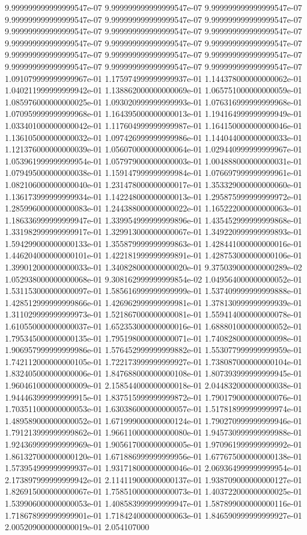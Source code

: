 9.999999999999999547e-07	9.999999999999999547e-07	9.999999999999999547e-07	9.999999999999999547e-07	9.999999999999999547e-07	9.999999999999999547e-07	9.999999999999999547e-07	9.999999999999999547e-07	9.999999999999999547e-07	9.999999999999999547e-07	9.999999999999999547e-07	9.999999999999999547e-07	9.999999999999999547e-07	9.999999999999999547e-07	9.999999999999999547e-07	9.999999999999999547e-07	9.999999999999999547e-07	9.999999999999999547e-07	1.091079999999999967e-01	1.175974999999999937e-01	1.144378000000000062e-01	1.040211999999999942e-01	1.138862000000000069e-01	1.065751000000000059e-01	1.085976000000000025e-01	1.093020999999999993e-01	1.076316999999999968e-01	1.070959999999999968e-01	1.164395000000000013e-01	1.194164999999999949e-01	1.033401000000000042e-01	1.117604999999999987e-01	1.164150000000000046e-01	1.136105000000000032e-01	1.097426999999999986e-01	1.144044000000000033e-01	1.121376000000000039e-01	1.056070000000000064e-01	1.029440999999999967e-01	1.053961999999999954e-01	1.057979000000000003e-01	1.004888000000000031e-01	1.079495000000000038e-01	1.159147999999999984e-01	1.076697999999999961e-01	1.082106000000000040e-01	1.231478000000000017e-01	1.353329000000000060e-01	1.136173999999999934e-01	1.142248000000000013e-01	1.295875999999999972e-01	1.285996000000000083e-01	1.244388000000000022e-01	1.165222000000000063e-01	1.186336999999999947e-01	1.339954999999999896e-01	1.435452999999999868e-01	1.331982999999999917e-01	1.329913000000000067e-01	1.349220999999999893e-01	1.594299000000000133e-01	1.355879999999999863e-01	1.428441000000000016e-01	1.446204000000000101e-01	1.422181999999999891e-01	1.428753000000000106e-01	1.399012000000000033e-01	1.340828000000000020e-01	9.375039000000000289e-02	1.052938000000000068e-01	9.308162999999999854e-02	1.049564000000000052e-01	1.531153000000000097e-01	1.585616999999999999e-01	1.537409999999999888e-01	1.428512999999999866e-01	1.426962999999999981e-01	1.378130999999999939e-01	1.311029999999999973e-01	1.521867000000000081e-01	1.559414000000000078e-01	1.610550000000000037e-01	1.652353000000000016e-01	1.688801000000000052e-01	1.795345000000000135e-01	1.795198000000000071e-01	1.740828000000000098e-01	1.906957999999999986e-01	1.576452999999999882e-01	1.553077999999999959e-01	1.742112000000000105e-01	1.722173999999999927e-01	1.738087000000000104e-01	1.832405000000000006e-01	1.847688000000000108e-01	1.807393999999999945e-01	1.960461000000000009e-01	2.158544000000000018e-01	2.044832000000000038e-01	1.944463999999999915e-01	1.837515999999999872e-01	1.790179000000000076e-01	1.703511000000000053e-01	1.630386000000000057e-01	1.517818999999999974e-01	1.489589000000000052e-01	1.671999000000000124e-01	1.790270999999999946e-01	1.791213999999999862e-01	1.966110000000000080e-01	1.945730999999999988e-01	1.924369999999999969e-01	1.905617000000000005e-01	1.970961999999999992e-01	1.861327000000000120e-01	1.671886999999999956e-01	1.677675000000000138e-01	1.573954999999999937e-01	1.931718000000000046e-01	2.069364999999999954e-01	2.173897999999999942e-01	2.114119000000000137e-01	1.938709000000000127e-01	1.826915000000000067e-01	1.758510000000000073e-01	1.403722000000000025e-01	1.539906000000000053e-01	1.408583999999999947e-01	1.587899000000000116e-01	1.718678999999999901e-01	1.718424000000000063e-01	1.846590999999999927e-01	2.005209000000000019e-01	2.054107000